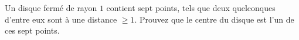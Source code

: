Un disque fermé de rayon $1$ contient sept points, tels que deux quelconques
d'entre eux sont à une distance $\geq 1$. Prouvez que le centre du disque
est l'un de ces sept points.
